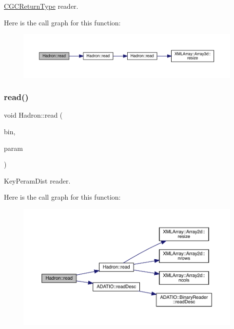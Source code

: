 \mbox{\hyperlink{structHadron_1_1CGCReturnType}{C\+G\+C\+Return\+Type}} reader. 

Here is the call graph for this function\+:
\nopagebreak
\begin{figure}[H]
\begin{center}
\leavevmode
\includegraphics[width=350pt]{d1/daf/namespaceHadron_a28b215f1b16c66c9862495bf8c11084f_cgraph}
\end{center}
\end{figure}
\mbox{\label{namespaceHadron_ac70286e9fd2f4a9ddf81f9235d1812e8}} 
\subsubsection{\texorpdfstring{read()}{read()}\hspace{0.1cm}{\footnotesize\ttfamily [29/94]}}
{\footnotesize\ttfamily void Hadron\+::read (\begin{DoxyParamCaption}\item[{\mbox{\hyperlink{classADATIO_1_1BinaryReader}{Binary\+Reader}} \&}]{bin,  }\item[{\mbox{\hyperlink{structHadron_1_1KeyPeramDist__t}{Key\+Peram\+Dist\+\_\+t}} \&}]{param }\end{DoxyParamCaption})}



Key\+Peram\+Dist reader. 

Here is the call graph for this function\+:
\nopagebreak
\begin{figure}[H]
\begin{center}
\leavevmode
\includegraphics[width=350pt]{d1/daf/namespaceHadron_ac70286e9fd2f4a9ddf81f9235d1812e8_cgraph}
\end{center}
\end{figure}
\mbox{\label{namespaceHadron_a9c6649bbe7b32cbc5fcbf8ebbf17d987}} 
